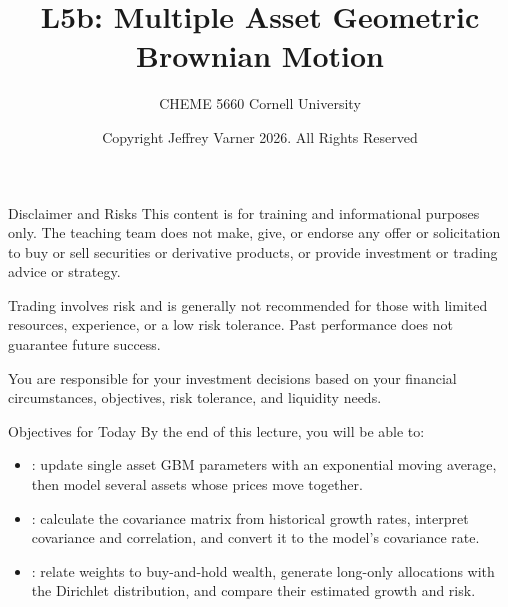 \documentclass[aspectratio=169,11pt]{beamer}
\title{\texorpdfstring{{\vnheavy L5b}}{L5b}: Multiple Asset Geometric Brownian Motion}
\subtitle{CHEME 5660 Cornell University}
\author{Copyright Jeffrey Varner 2026. All Rights Reserved}
\begin{document}
\vntitlepage

\begin{frame}{Disclaimer and Risks}
  \vspace{0.6em}
  \textbf{} This content is for training and informational
  purposes only. The teaching team does not make, give, or endorse any offer or
  solicitation to buy or sell securities or derivative products, or provide
  investment or trading advice or strategy.

  \vspace{1.1em}
  \textbf{} Trading involves risk and is generally not recommended for
  those with limited resources, experience, or a low risk tolerance. Past
  performance does not guarantee future success.

  \vspace{1.1em}
  \textbf{} You are responsible for your investment decisions
  based on your financial circumstances, objectives, risk tolerance, and
  liquidity needs.
\end{frame}

\begin{frame}{Objectives for Today}
By the end of this lecture, you will be able to:

  \vspace{0.8em}
  \begin{itemize}\setlength{\itemsep}{0.8em}
    \item {}: update single asset GBM parameters
      with an exponential moving average, then model several assets whose
      prices move together.
    \item {}: calculate the covariance
      matrix from historical growth rates, interpret covariance and
      correlation, and convert it to the model's covariance rate.
    \item {}: relate weights to
      buy-and-hold wealth, generate long-only allocations with the Dirichlet
      distribution, and compare their estimated growth and risk.
  \end{itemize}
\end{frame}
\end{document}

